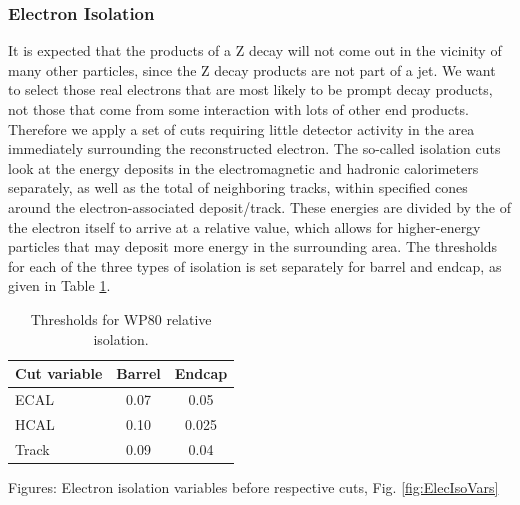 \subsubsection{Electron Isolation}
\label{evSel:isol}
It is expected that the products of a Z decay will not come out in the vicinity of many other particles, 
since the Z decay products are not part of a jet.
We want to select those real electrons that are most likely to be prompt decay products,
not those that come from some interaction with lots of other end products.  
Therefore we apply a set of cuts requiring little detector activity in the area immediately surrounding the reconstructed electron.  
The so-called isolation cuts look at the energy deposits in the electromagnetic and hadronic calorimeters separately,
as well as the total \pt of neighboring tracks, within specified \DR cones around the electron-associated deposit/track.  
These energies are divided by the \pt of the electron itself to arrive at a relative value,
which allows for higher-energy particles that may deposit more energy in the surrounding area.  
The thresholds for each of the three types of isolation is set separately for barrel and endcap, 
as given in Table \ref{TableEisoCuts}.  


\begin{table}[htbp]
  \begin{center}
    \caption{Thresholds for WP80 relative isolation.}
    \label{TableEisoCuts}
    \begin{tabular}[]{ | l | c | c | }
      \hline
      Cut variable & Barrel & Endcap  \\ \hline \hline
      ECAL & 0.07 & 0.05  \\ \hline
      HCAL & 0.10 & 0.025  \\ \hline
      Track & 0.09 & 0.04 \\ %
      \hline
    \end{tabular}
  \end{center}
\end{table}

Figures: Electron isolation variables before respective cuts, Fig. \ref{fig:ElecIsoVars}

